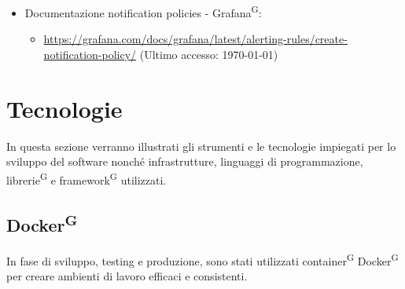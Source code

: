 \documentclass[8pt]{article}
\newcommand{\glossterm}[1]{#1\textsuperscript{G}} %
\begin{document}
\begin{itemize}
    \begin{itemize}
		\item \href{https://grafana.com/docs/grafana/latest/alerting/}{\color{myblue}https://grafana.com/docs/grafana/latest/alerting/} (Ultimo accesso: \today)
	\end{itemize}
    \item Documentazione notification policies - \glossterm{Grafana}:
    \begin{itemize}
		\item \href{https://grafana.com/docs/grafana/latest/alerting-rules/create-notification-policy/}{\color{myblue}https://grafana.com/docs/grafana/latest/alerting-rules/create-notification-policy/} (Ultimo accesso: \today)
	\end{itemize}
\end{itemize}
\newpage
\clearpage
\section{Tecnologie}\label{sec:tec}
In questa sezione verranno illustrati gli strumenti e le tecnologie impiegati per lo sviluppo del software nonché infrastrutture, linguaggi di programmazione, \glossterm{librerie} e \glossterm{framework} utilizzati.
\subsection{\glossterm{Docker}}
In fase di sviluppo, testing e produzione, sono stati utilizzati \glossterm{container} \glossterm{Docker} per creare ambienti di lavoro efficaci e consistenti.
\end{document}
